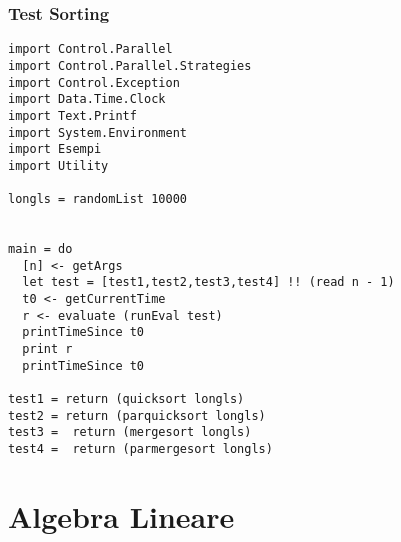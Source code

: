 \subsubsection{Test Sorting}
\begin{verbatim}
import Control.Parallel
import Control.Parallel.Strategies
import Control.Exception
import Data.Time.Clock
import Text.Printf
import System.Environment
import Esempi
import Utility

longls = randomList 10000


main = do
  [n] <- getArgs
  let test = [test1,test2,test3,test4] !! (read n - 1)
  t0 <- getCurrentTime
  r <- evaluate (runEval test)
  printTimeSince t0
  print r
  printTimeSince t0

test1 = return (quicksort longls)
test2 = return (parquicksort longls)
test3 =  return (mergesort longls)
test4 =  return (parmergesort longls)
\end{verbatim}
\section{Algebra Lineare}
